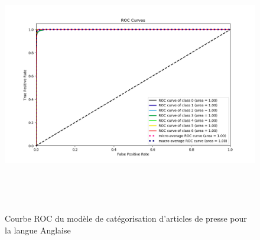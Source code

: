     \begin{figure}[H]
        \centering
        \includegraphics[height=320pt,width=330pt]{img/chapter4/result/rocEN.png}
        \caption{Courbe ROC du modèle de catégorisation d'articles de presse pour la langue Anglaise}
        \label{roc-en}
    \end{figure}

